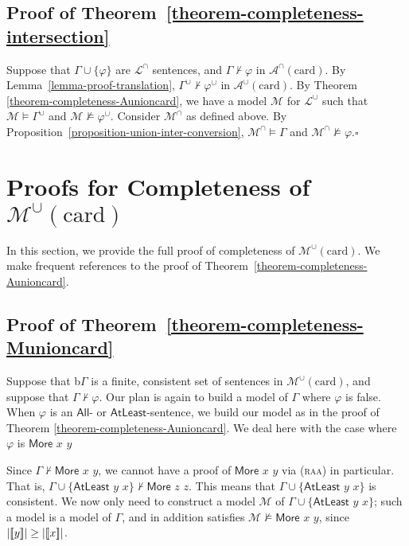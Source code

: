 \documentclass[letterpaper]{article} %
\theoremstyle{definition}
\newcommand{\semantics}[1]{[\![\mbox{\em $ #1 $\/}]\!]}
\newcommand{\Model}{\mathcal{M}}
\newcommand{\set}[1]{\{ #1 \}}
\newcommand{\proves}{\vdash}
\newcommand{\lang}{\mathcal{L}}
\renewcommand{\phi}{\varphi}
\newcommand{\Aunion}{\mathscr{A}^{\cup}}
\newcommand{\Munion}{\mathscr{M}^{\cup}}
\newcommand{\Ainter}{\mathscr{A}^{\cap}}
\newcommand{\proverule}{\textsc}
\newcommand{\raa}{\proverule{raa}}
\newcommand{\Atleast}[2]{\mathsf{AtLeast}\,\,#1\,\,#2}
\newcommand{\More}[2]{\mathsf{More}\,\,#1\,\,#2}
\newcommand{\AllNoArgs}{\mathsf{All}}
\newcommand{\AtleastNoArgs}{\mathsf{AtLeast}}
\newcommand{\card}{\mathrm{card}}
\begin{document}
\subsection*{Proof of Theorem~\ref{theorem-completeness-intersection}}

Suppose that $\Gamma\cup\set{\phi}$ are $\lang^\cap$
sentences, and $\Gamma \not \proves \varphi$ in $\Ainter(\card)$.
By Lemma~\ref{lemma-proof-translation},  $\Gamma^\cup\not\proves\phi^\cup$ in $\Aunion(\card)$.
By Theorem \ref{theorem-completeness-Aunioncard},
we have a model $\Model$ for $\lang^\cup$
such that $\Model \models \Gamma^\cup$ and $\Model \not \models \varphi^\cup$. 
Consider $\Model^\cap$ as defined  above.
By Proposition~\ref{proposition-union-inter-conversion},
$\Model^\cap\models\Gamma$
and $\Model^\cap\not\models\phi$.\hfill$\square$


\section{Proofs for Completeness of $\Munion(\card)$}
\label{s:supp:completeness-Munioncard}

In this section, we provide the full proof of completeness of $\Munion(\card)$.  We make frequent references to the proof of Theorem~\ref{theorem-completeness-Aunioncard}. 

\subsection*{Proof of Theorem~\ref{theorem-completeness-Munioncard}}

Suppose that b$\Gamma$ is a finite, consistent set of sentences in $\Munion(\card)$, and suppose that $\Gamma \not \proves \varphi$.  Our plan is again to build a model of $\Gamma$ where $\varphi$ is false.
When $\varphi$ is an $\AllNoArgs$- or $\AtleastNoArgs$-sentence, we build our model as in the proof of Theorem \ref{theorem-completeness-Aunioncard}.  We deal here with the case where $\varphi$ is $\More{x}{y}$

Since $\Gamma \not \proves \More{x}{y}$, we cannot have a proof of $\More{x}{y}$ via (\raa) in particular.  That is, $\Gamma \cup \set{\Atleast{y}{x}} \not \proves \More{z}{z}$.  This means that $\Gamma \cup \set{\Atleast{y}{x}}$ is consistent.  We now only need to construct a model $\Model$ of $\Gamma \cup \set{\Atleast{y}{x}}$; such a model is a model of $\Gamma$, and in addition satisfies $\Model \not \models \More{x}{y}$, since $|\semantics{y}| \ge |\semantics{x}|$.
\end{document}
